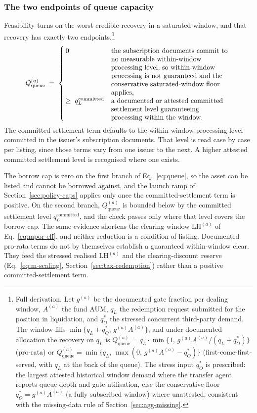 \subsubsection{The two endpoints of queue capacity}
Feasibility turns on the worst credible recovery in a saturated window, and
that recovery has exactly two endpoints.\footnote{Full derivation. Let $g^{(a)}$ be the
documented gate fraction per dealing window, $A^{(a)}$ the fund AUM, $q_L$ the redemption
request submitted for the position in liquidation, and $q_O^{*}$ the stressed concurrent
third-party demand. The window fills $\min\{q_L+q_O^{*},\,g^{(a)}A^{(a)}\}$, and under
documented allocation the recovery on $q_L$ is
$Q_{\mathrm{queue}}^{(a)} = q_L\cdot\min\{1,\,g^{(a)}A^{(a)}/(q_L+q_O^{*})\}$
(pro-rata) or
$Q_{\mathrm{queue}}^{(a)} = \min\{q_L,\,\max(0,\,g^{(a)}A^{(a)}-q_O^{*})\}$
(first-come-first-served, with $q_L$ at the back of the queue). The stress input
$q_O^{*}$ is prescribed: the largest
attested historical window demand where the transfer agent reports queue depth and
gate utilisation, else the conservative floor
$q_O^{*}=g^{(a)}A^{(a)}$ (a fully subscribed window) where unattested, consistent
with the missing-data rule of Section~\ref{sec:agg-missing}.}
\begin{equation}\label{eq:queue}
Q_{\mathrm{queue}}^{(a)} \;=\;
\begin{cases}
\, 0
  & \parbox[t]{0.5\linewidth}{\raggedright the subscription documents commit to no measurable within-window processing level, so within-window processing is not guaranteed and the conservative saturated-window floor applies,}\\[0.6em]
\, \ge \; q_L^{\mathrm{committed}}
  & \parbox[t]{0.5\linewidth}{\raggedright a documented or attested committed settlement level guaranteeing processing within the window.}
\end{cases}
\end{equation}
The committed-settlement term defaults to the within-window processing level committed in
the issuer's subscription documents. That level is read case by case per listing, since
those terms vary from one issuer to the next. A higher attested committed settlement
level is recognised where one exists.

The borrow cap is zero on the first branch of Eq.~\eqref{eq:queue}, so the
asset can be listed and cannot be borrowed against, and the launch ramp of
Section~\ref{sec:policy-caps} applies only once the committed-settlement term is positive.
On the second branch, $Q_{\mathrm{queue}}^{(a)}$ is bounded
below by the committed settlement level $q_L^{\mathrm{committed}}$, and the check passes
only where that level covers the borrow cap. The same evidence shortens the clearing window
$\mathrm{LH}^{(a)}$ of Eq.~\eqref{eq:mpor-eff}, and neither reduction is a condition of
listing. Documented pro-rata terms do not by themselves establish a guaranteed
within-window clear. They feed the stressed realised $\mathrm{LH}^{(a)}$ and the
clearing-discount reserve (Eq.~\eqref{eq:m-scaling}, Section~\ref{sec:tax-redemption})
rather than a positive committed-settlement term.

